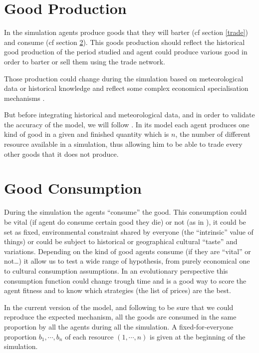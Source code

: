 \documentclass[a4paper]{article}
\begin{document}
\section{Good Production}
\label{production}


In the simulation agents produce goods that they will barter (cf section \ref{trade}) and consume (cf section \ref{consumption}). This goods production should reflect the historical good production of the period studied and agent could produce various good in order to barter or sell them using the trade network.

Those production could change during the simulation based on meteorological data or historical knowledge and reflect some complex economical specialisation mechanisms \cite{bentley2005specialisationandwealthinequalityinamodelofaclusteredeconomicnetwork}.

But before integrating historical and meteorological data, and in order to validate the accuracy of the model, we will follow \cite{gintis2006theemergenceofapricesystemfromdecentralizedbilateralexchange}. In its model each agent produces one kind of good in a given and finished quantity which is $n$, the number of different resource available in a simulation, thus allowing him to be able to trade every other goods that it does not produce.

\section{Good Consumption}
\label{consumption}



During the simulation the agents ``consume'' the good. This consumption could be vital (if agent do consume certain good they die) or not (as in \cite{macmillan2008anagentbasedsimulationmodelofaprimitiveagriculturalsociety}), it could be set as fixed, environmental constraint shared by everyone (the ``intrinsic'' value of things) or could be subject to historical or geographical cultural ``taste'' and variations. Depending on the kind of good agents consume (if they are ``vital'' or not\ldots) it allow us to test a wide range of hypothesis, from purely economical one to cultural consumption assumptions.  In an evolutionary perspective this consumption function could change trough time and is a good way to score the agent fitness and to know which strategies (the list of prices) are the best.

In the current version of the model, and following \cite{gintis2006theemergenceofapricesystemfromdecentralizedbilateralexchange} to be sure that we could reproduce the expected mechanism, all the goods are consumed in the same proportion by all the agents during all the simulation. A fixed-for-everyone proportion $b_1,\cdots,b_n$ of each resource $(1, \cdots, n)$ is given at the beginning of the simulation.
\end{document}
